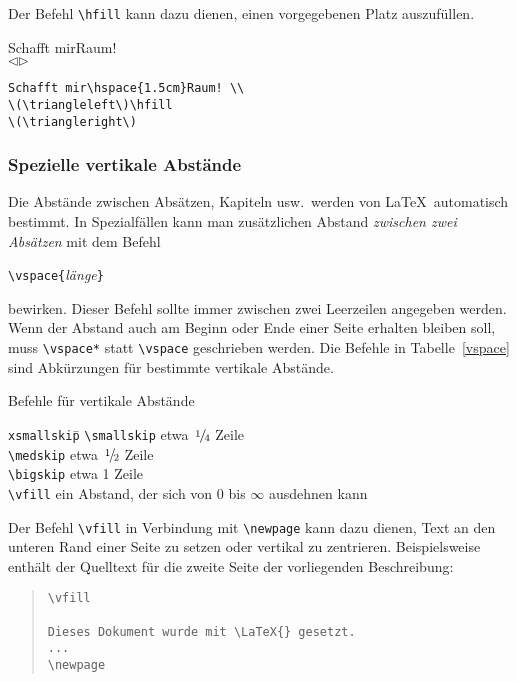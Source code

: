 Der Befehl \verb|\hfill| kann dazu dienen, einen vorgegebenen
Platz auszufüllen.
\exa
\raggedright
Schafft mir\hspace{1.5cm}Raum! \\
\(\triangleleft\)\hfill \(\triangleright\)\\
\exb
\begin{verbatim}
Schafft mir\hspace{1.5cm}Raum! \\
\(\triangleleft\)\hfill 
\(\triangleright\)
\end{verbatim}
\exc


\subsubsection{Spezielle vertikale Abstände} \label{vabstaende}
 
Die Abstände zwischen Absätzen, Kapiteln usw.\ werden von
\LaTeX\ automatisch bestimmt.
In Spezialfällen kann man zusätzlichen Abstand
\emph{zwischen zwei Absätzen} mit dem Befehl
\begin{beispiel}
\verb|\vspace{|\textit{länge}\verb|}|
\end{beispiel}
bewirken.
Dieser Befehl sollte immer zwischen zwei Leerzeilen angegeben
werden.
Wenn der Abstand auch am Beginn oder Ende einer Seite erhalten
bleiben soll, muss \verb|\vspace*| statt \verb|\vspace|
geschrieben werden.
Die Befehle in Tabelle~\ref{vspace} sind Abkürzungen für
bestimmte vertikale Abstände.
\begin{table}[t]
\caption{Befehle für vertikale Abstände} \label{vspace}
\begin{lminipage}{13cm}
\begin{tabbing}
\texttt{xsmallskip}\qquad \= \kill
\verb|\smallskip| \> etwa \(\nfrac{1}{4}\) Zeile \\
\verb|\medskip|   \> etwa \(\nfrac{1}{2}\) Zeile \\
\verb|\bigskip|   \> etwa 1 Zeile \\
\verb|\vfill|     \> ein Abstand, der sich von 0 bis \(\infty\)
                     ausdehnen kann
\end{tabbing}
\end{lminipage}
\end{table}
Der Befehl \verb|\vfill| in Verbindung mit \verb|\newpage|
kann dazu dienen, Text an den unteren Rand einer Seite zu setzen
oder vertikal zu zentrieren.  Beispielsweise enthält der Quelltext
für die zweite Seite der vorliegenden Beschreibung:
\begin{quote}
\begin{verbatim}
\vfill

Dieses Dokument wurde mit \LaTeX{} gesetzt.
...
\newpage
\end{verbatim}
\end{quote}
 
